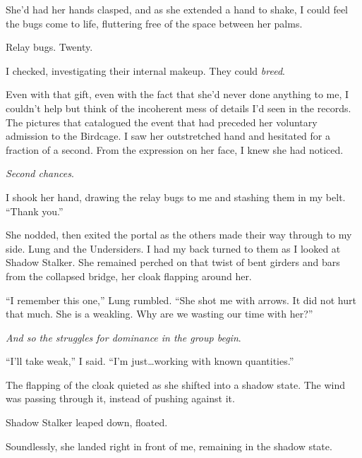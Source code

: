 She'd had her hands clasped, and as she extended a hand to shake, I could feel the bugs come to life, fluttering free of the space between her palms.



Relay bugs.  Twenty.



I checked, investigating their internal makeup.  They could \emph{breed}.



Even with that gift, even with the fact that she'd never done anything to me, I couldn't help but think of the incoherent mess of details I'd seen in the records.  The pictures that catalogued the event that had preceded her voluntary admission to the Birdcage.  I saw her outstretched hand and hesitated for a fraction of a second.  From the expression on her face, I knew she had noticed.



\emph{Second chances}.



I shook her hand, drawing the relay bugs to me and stashing them in my belt.  ``Thank you.''



She nodded, then exited the portal as the others made their way through to my side.  Lung and the Undersiders.  I had my back turned to them as I looked at Shadow Stalker.  She remained perched on that twist of bent girders and bars from the collapsed bridge, her cloak flapping around her.



``I remember this one,'' Lung rumbled.  ``She shot me with arrows.  It did not hurt that much.  She is a weakling.  Why are we wasting our time with her?''



\emph{And so the struggles for dominance in the group begin}.



``I'll take weak,'' I said.  ``I'm just\ldots working with known quantities.''



The flapping of the cloak quieted as she shifted into a shadow state.  The wind was passing through it, instead of pushing against it.



Shadow Stalker leaped down, floated.



Soundlessly, she landed right in front of me, remaining in the shadow state.



